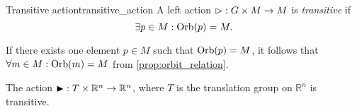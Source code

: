 \begin{definition}{Transitive action}{transitive_action}
    A left action \(\mathbin{\vartriangleright} : G \times M \to M\) is \emph{transitive} if
    \begin{equation*}
        \exists p \in M : \operatorname{Orb}(p) = M.
    \end{equation*}
\end{definition}
\begin{remark}
    If there exists one element \(p \in M\) such that \(\operatorname{Orb}(p) = M\), it follows that \(\forall m \in M : \operatorname{Orb}(m) = M\) from \cref{prop:orbit_relation}.
\end{remark}
\begin{example}
    The action \(\mathbin{\blacktriangleright} : T \times \mathbb{R}^n \to \mathbb{R}^n\), where \(T\) is the translation group on \(\mathbb{R}^n\) is transitive.
\end{example}

